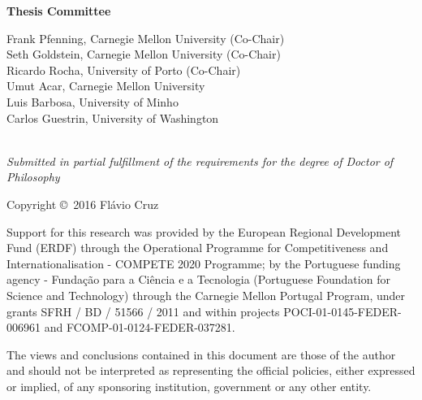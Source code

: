\begin{center}

{\bf Thesis Committee \\}

Frank Pfenning, Carnegie Mellon University (Co-Chair)\\
Seth Goldstein, Carnegie Mellon University (Co-Chair)\\
Ricardo Rocha, University of Porto (Co-Chair)\\
Umut Acar, Carnegie Mellon University\\
Luis Barbosa, University of Minho\\
Carlos Guestrin, University of Washington\\\
\vspace{0.2in}

\emph{Submitted in partial fulfillment of the requirements for the degree of Doctor of Philosophy}

\vspace{0.1in}

Copyright \copyright\ 2016 Fl\'{a}vio Cruz

\vspace{0.2in}

{\medskip\footnotesize\noindent
Support for this research was provided by the European Regional Development
Fund (ERDF) through the Operational Programme for Competitiveness and
Internationalisation - COMPETE 2020 Programme; by the Portuguese funding agency
- Funda\c{c}\~{a}o para a Ci\^{e}ncia e a
Tecnologia (Portuguese Foundation for Science and Technology) through the
Carnegie Mellon Portugal Program, under grants SFRH / BD / 51566 / 2011 and
within projects POCI-01-0145-FEDER-006961 and FCOMP-01-0124-FEDER-037281.

The views and conclusions contained in this document are those of the author and
should not be interpreted as representing the official policies, either
expressed or implied, of any sponsoring institution, government or any other
entity.

\par}

\end{center}
